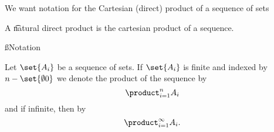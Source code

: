 

We want notation for the Cartesian (direct) product of a sequence of sets


A \t{natural direct product} is the cartesian product of a sequence.

\ss{Notation}

Let $\set{A_i}$ be a sequence of sets.
If $\set{A_i}$ is finite and indexed by $n - \set{\emptyset{0}}$ we denote
the product of the sequence by
\[
  \product_{i = 1}^{n} A_i
\]
and if infinite, then by
\[
  \product_{i = 1}^{\infty} A_i.
\]

\blankpage
